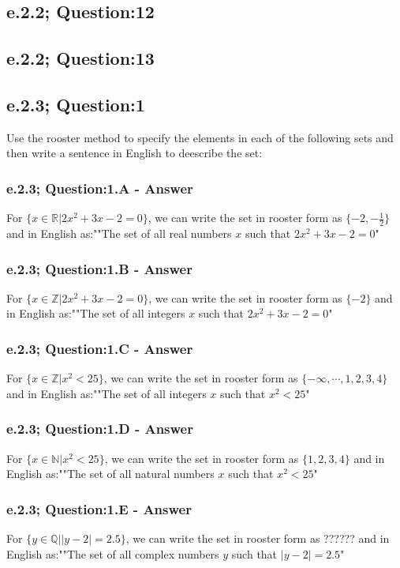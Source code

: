\subsection{e.2.2; Question:12}

\subsection{e.2.2; Question:13}

\newpage
\subsection{e.2.3; Question:1}
Use the rooster method to specify the elements in each of the following sets and then write a sentence in English to deescribe the set: 


\subsubsection*{e.2.3; Question:1.A - Answer}
For $\{ x \in \mathbb{R}| 2x^2 + 3x -2 = 0 \}$, we can write the set in rooster form as $\{-2, -\frac{1}{2} \}$ and in English as:""The set of all real numbers $x$ such that $2x^2 + 3x -2 = 0$"

\subsubsection*{e.2.3; Question:1.B - Answer}
For $\{ x \in \mathbb{Z}| 2x^2 + 3x -2 = 0 \}$, we can write the set in rooster form as $\{-2 \}$ and in English as:""The set of all integers $x$ such that $2x^2 + 3x -2 = 0$"

\subsubsection*{e.2.3; Question:1.C - Answer}
For $\{ x \in \mathbb{Z}| x^2 < 25 \}$, we can write the set in rooster form as $\{-\infty, \cdots, 1, 2, 3, 4 \}$ and in English as:""The set of all integers $x$ such that $x^2 < 25$"


\subsubsection*{e.2.3; Question:1.D - Answer}
For $\{ x \in \mathbb{N}| x^2 < 25 \}$, we can write the set in rooster form as $\{1, 2, 3, 4 \}$ and in English as:""The set of all natural numbers $x$ such that $x^2 < 25$"

\subsubsection*{e.2.3; Question:1.E - Answer}
For $\{ y \in \mathbb{Q}| |y-2|=2.5 \}$, we can write the set in rooster form as ?????? and in English as:""The set of all complex numbers $y$ such that $|y-2|=2.5$"

